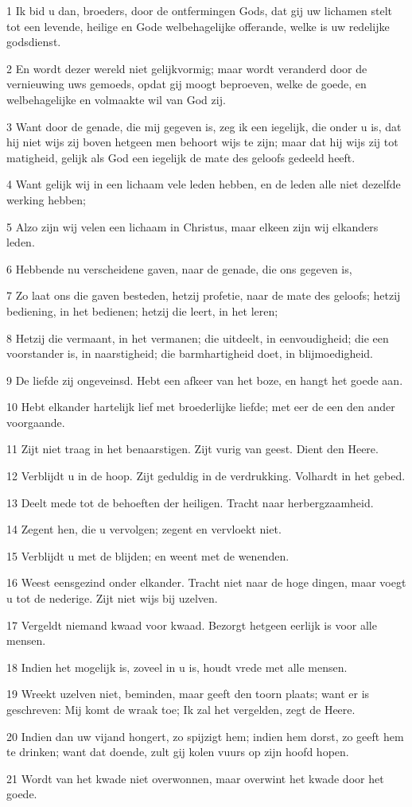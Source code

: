 \par 1 Ik bid u dan, broeders, door de ontfermingen Gods, dat gij uw lichamen stelt tot een levende, heilige en Gode welbehagelijke offerande, welke is uw redelijke godsdienst.
\par 2 En wordt dezer wereld niet gelijkvormig; maar wordt veranderd door de vernieuwing uws gemoeds, opdat gij moogt beproeven, welke de goede, en welbehagelijke en volmaakte wil van God zij.
\par 3 Want door de genade, die mij gegeven is, zeg ik een iegelijk, die onder u is, dat hij niet wijs zij boven hetgeen men behoort wijs te zijn; maar dat hij wijs zij tot matigheid, gelijk als God een iegelijk de mate des geloofs gedeeld heeft.
\par 4 Want gelijk wij in een lichaam vele leden hebben, en de leden alle niet dezelfde werking hebben;
\par 5 Alzo zijn wij velen een lichaam in Christus, maar elkeen zijn wij elkanders leden.
\par 6 Hebbende nu verscheidene gaven, naar de genade, die ons gegeven is,
\par 7 Zo laat ons die gaven besteden, hetzij profetie, naar de mate des geloofs; hetzij bediening, in het bedienen; hetzij die leert, in het leren;
\par 8 Hetzij die vermaant, in het vermanen; die uitdeelt, in eenvoudigheid; die een voorstander is, in naarstigheid; die barmhartigheid doet, in blijmoedigheid.
\par 9 De liefde zij ongeveinsd. Hebt een afkeer van het boze, en hangt het goede aan.
\par 10 Hebt elkander hartelijk lief met broederlijke liefde; met eer de een den ander voorgaande.
\par 11 Zijt niet traag in het benaarstigen. Zijt vurig van geest. Dient den Heere.
\par 12 Verblijdt u in de hoop. Zijt geduldig in de verdrukking. Volhardt in het gebed.
\par 13 Deelt mede tot de behoeften der heiligen. Tracht naar herbergzaamheid.
\par 14 Zegent hen, die u vervolgen; zegent en vervloekt niet.
\par 15 Verblijdt u met de blijden; en weent met de wenenden.
\par 16 Weest eensgezind onder elkander. Tracht niet naar de hoge dingen, maar voegt u tot de nederige. Zijt niet wijs bij uzelven.
\par 17 Vergeldt niemand kwaad voor kwaad. Bezorgt hetgeen eerlijk is voor alle mensen.
\par 18 Indien het mogelijk is, zoveel in u is, houdt vrede met alle mensen.
\par 19 Wreekt uzelven niet, beminden, maar geeft den toorn plaats; want er is geschreven: Mij komt de wraak toe; Ik zal het vergelden, zegt de Heere.
\par 20 Indien dan uw vijand hongert, zo spijzigt hem; indien hem dorst, zo geeft hem te drinken; want dat doende, zult gij kolen vuurs op zijn hoofd hopen.
\par 21 Wordt van het kwade niet overwonnen, maar overwint het kwade door het goede.

